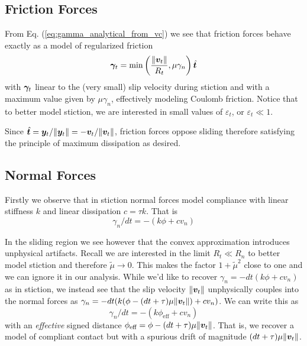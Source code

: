 \subsection{Friction Forces}
From Eq. (\ref{eq:gamma_analytical_from_vc}) we see that friction forces behave exactly as a
model of regularized friction
\begin{equation}
	{\bm\gamma}_t = \min\left(\frac{\Vert{\bm{v}}_t\Vert}{R_t}, \mu\gamma_n\right)\hat{{\bm{t}}}
\end{equation}
with ${\bm\gamma}_t$ linear to the (very small) slip velocity during stiction and
with a maximum value given by $\mu\gamma_n$, effectively modeling Coulomb
friction. Notice that to better model stiction, we are interested in small
values of $\varepsilon_t$, or $\varepsilon_t\ll 1$.

Since $\hat{{\bm{t}}} = {\bm{y}}_t/\Vert{\bm{y}}_t\Vert =
-{\bm{v}}_t/\Vert{\bm{v}}_t\Vert$, friction forces oppose sliding therefore
satisfying the principle of maximum dissipation as desired.

\subsection{Normal Forces}
Firstly we observe that in stiction normal forces model compliance with linear
stiffness $k$ and linear dissipation $c = \tau k$. That is
\begin{equation}
    \gamma_n/dt = -(k\phi + c v_n)
\end{equation}

In the sliding region we see however that the convex approximation introduces
unphysical artifacts. Recall we are interested in the limit $R_t \ll R_n$ to
better model stiction and therefore $\tilde\mu \rightarrow 0$.
This makes the
factor $1+\tilde{\mu}^2$ close to one and we can ignore it in our analysis.
While we'd like to recover $\gamma_n = -dt(k\phi + c v_n)$ as in stiction, we
instead see that the slip velocity $\Vert{\bm{v}}_t\Vert$ unphysically couples
into the normal forces as $\gamma_n=-dt(k(\phi-(dt+\tau)\mu\Vert{\bm{v}}_t\Vert) +
cv_n)$. We can write this as
\begin{equation}
  \gamma_n/dt=-(k\phi_\text{eff} + c v_n)
\end{equation}
with an \textit{effective} signed distance $\phi_\text{eff} =
\phi-(dt+\tau)\mu\Vert{\bm{v}}_t\Vert$. That is, we recover a model of compliant
contact but with a spurious drift of magnitude $(dt+\tau)\mu\Vert{\bm{v}}_t\Vert$.

